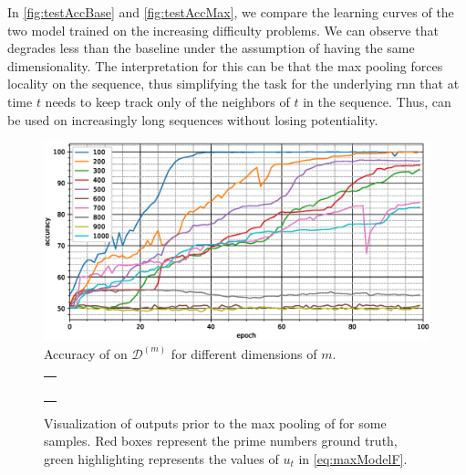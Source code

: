 In \cref{fig:testAccBase} and \cref{fig:testAccMax}, we compare
the learning curves of the two model trained on the increasing
difficulty problems. We can observe 
that \maxp{} degrades less than the baseline under the assumption of
having the same dimensionality. The interpretation for this can be
that the max pooling forces locality on the sequence, thus simplifying
the task for the underlying \ac{rnn} that at time $t$ needs to keep
track only of the neighbors of $t$ in the sequence. Thus, \maxp{} can
be used on increasingly long sequences without losing potentiality.

\begin{figure}
  \centering
  \includegraphics[width=\floatwidth]{imgMax/accuracy-int.eps}
  \caption{Accuracy of \maxi{} on $\mathcal{D}^{(m)}$ for different dimensions of $m$.}
  \label{fig:testAccInt}
\end{figure}

\begin{figure}
  \centering
  \footnotesize
  \begin{tabular}{|p{\floatwidth}|}
    \hline
    \\
    \hline
    \\
    \hline
    \\
    \hline
    \\
    \hline
    \\
    \hline
    \\
    \hline
  \end{tabular}
  \caption{Visualization of outputs prior to the max pooling of
    \maxi{} for some 
    samples. Red boxes represent the prime numbers ground
    truth, green highlighting represents the values of $u_t$ in
    \eqref{eq:maxModelF}.}
  \label{fig:testAttention}
\end{figure}

